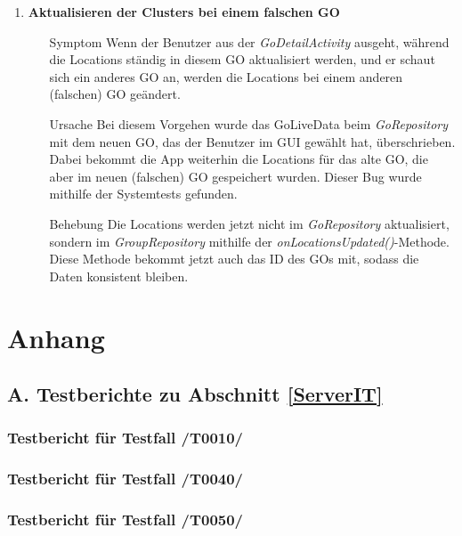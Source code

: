 \documentclass[11pt,a4paper]{scrartcl}
\def\threedigits#1{%
  \ifnum#1<100 0\fi
  \ifnum#1<10 0\fi
  \number#1}
\begin{document}
\begin{enumerate}[label={\textbf{/B\protect\threedigits{\theenumi}0/}}, leftmargin=*]
\item \textbf{Aktualisieren der Clusters bei einem falschen GO}
	\begin{itemize}
		\item[Symptom] Wenn der Benutzer aus der \textit{GoDetailActivity} ausgeht, während die Locations ständig in diesem GO aktualisiert werden, und er schaut sich ein anderes GO an, werden die Locations bei einem anderen (falschen) GO geändert.
		\item[Ursache] Bei diesem Vorgehen wurde das GoLiveData beim \textit{GoRepository} mit dem neuen GO, das der Benutzer im GUI gewählt hat, überschrieben. Dabei bekommt die App weiterhin die Locations für das alte GO, die aber im neuen (falschen) GO gespeichert wurden. Dieser Bug wurde mithilfe der Systemtests gefunden.
		\item[Behebung] Die Locations werden jetzt nicht im \textit{GoRepository} aktualisiert, sondern im \textit{GroupRepository} mithilfe der \textit{onLocationsUpdated()}-Methode. Diese Methode bekommt jetzt auch das ID des GOs mit, sodass die Daten konsistent bleiben.
	\end{itemize}

\end{enumerate}

\newpage

\section{Anhang}

\subsection{A. Testberichte zu Abschnitt \ref{ServerIT}}

\subsubsection{Testbericht für Testfall /T0010/}

\newpage
\subsubsection{Testbericht für Testfall /T0040/}

\newpage
\subsubsection{Testbericht für Testfall /T0050/}
\end{document}
